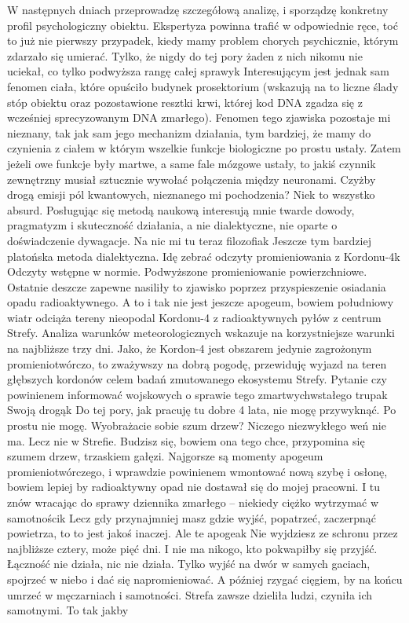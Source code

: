 \documentclass[../MAIN.tex]{subfiles}
\begin{document}
W następnych dniach przeprowadzę szczegółową analizę, i sporządzę konkretny profil psychologiczny obiektu. Ekspertyza powinna trafić w odpowiednie ręce, toć to już nie pierwszy przypadek, kiedy mamy problem chorych psychicznie, którym zdarzało się umierać. Tylko, że nigdy do tej pory żaden z nich nikomu nie uciekał, co tylko podwyższa rangę całej sprawy\3k
% 
% 
Interesującym jest jednak sam fenomen ciała, które opuściło budynek prosektorium (wskazują na to liczne ślady stóp obiektu oraz pozostawione resztki krwi, której kod DNA zgadza się z wcześniej sprecyzowanym DNA zmarłego). Fenomen tego zjawiska pozostaje mi nieznany, tak jak sam jego mechanizm działania, tym bardziej, że mamy do czynienia z ciałem w którym wszelkie funkcje biologiczne po prostu ustały. Zatem jeżeli owe funkcje były martwe, a same fale mózgowe ustały, to jakiś czynnik zewnętrzny musiał sztucznie wywołać połączenia między neuronami. Czyżby drogą emisji pól kwantowych, nieznanego mi pochodzenia? Nie\3k to wszystko absurd. Posługując się metodą naukową interesują mnie twarde dowody, pragmatyzm i skuteczność działania, a nie dialektyczne, nie oparte o doświadczenie dywagacje. Na nic mi tu teraz filozofia\3k Jeszcze tym bardziej platońska metoda dialektyczna.
% 
% 
Idę zebrać odczyty promieniowania z Kordonu-4\3k
% 
% 
Odczyty wstępne w normie. Podwyższone promieniowanie powierzchniowe. Ostatnie deszcze zapewne nasiliły to zjawisko poprzez przyspieszenie osiadania opadu radioaktywnego. A to i tak nie jest jeszcze apogeum, bowiem południowy wiatr odciąża tereny nieopodal Kordonu-4 z radioaktywnych pyłów z centrum Strefy. Analiza warunków meteorologicznych wskazuje na korzystniejsze warunki na najbliższe trzy dni. Jako, że Kordon-4 jest obszarem jedynie zagrożonym promieniotwórczo, to zważywszy na dobrą pogodę, przewiduję wyjazd na teren głębszych kordonów celem badań zmutowanego ekosystemu Strefy. Pytanie czy powinienem informować wojskowych o sprawie tego zmartwychwstałego trupa\3k
% 
% 
Swoją drogą\3k Do tej pory, jak pracuję tu dobre 4 lata, nie mogę przywyknąć. Po prostu nie mogę. Wyobrażacie sobie szum drzew? Niczego niezwykłego weń nie ma. Lecz nie w Strefie. Budzisz się, bowiem ona tego chce, przypomina się szumem drzew, trzaskiem gałęzi. Najgorsze są momenty apogeum promieniotwórczego, i wprawdzie powinienem wmontować nową szybę i osłonę, bowiem lepiej by radioaktywny opad nie dostawał się do mojej pracowni. I tu znów wracając do sprawy dziennika zmarłego -- niekiedy ciężko wytrzymać w samotności\3k Lecz gdy przynajmniej masz gdzie wyjść, popatrzeć, zaczerpnąć powietrza, to to jest jakoś inaczej. Ale te apogea\3k Nie wyjdziesz ze schronu przez najbliższe cztery, może pięć dni. I nie ma nikogo, kto pokwapiłby się przyjść. Łączność nie działa, nic nie działa. Tylko wyjść na dwór w samych gaciach, spojrzeć w niebo i dać się napromieniować. A później rzygać cięgiem, by na końcu umrzeć w męczarniach i samotności. Strefa zawsze dzieliła ludzi, czyniła ich samotnymi. To tak jakby 
\end{document}
